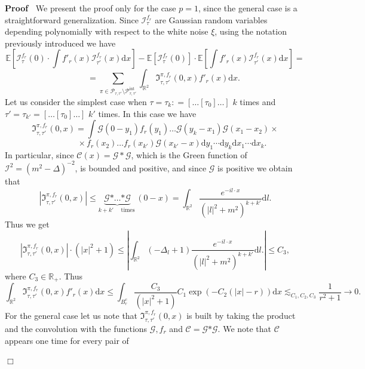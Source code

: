 \documentclass[a4paper,10pt]{article}
\newcommand{\asterisk}{\mathord{*}}
\newcommand{\mathd}{\mathrm{d}}
\newcommand{\tmop}[1]{\ensuremath{\operatorname{#1}}}
\newenvironment{proof}{\noindent\textbf{Proof\ }}{\hspace*{\fill}$\Box$\medskip}
\begin{document}
\begin{proof}
  We present the proof only for the case $p = 1$, since the general case is a
  straightforward generalization. Since $\mathcal{I}^{f_r}_{\tau}$ are
  Gaussian random variables depending polynomially with respect to the white
  noise $\xi$, using the notation previously introduced we have
  \[ \mathbb{E} \left[ \mathcal{I}^{f_r}_{\tau} (0) \cdot \int f'_r (x)
     \mathcal{I}^{f_r}_{\tau'} (x) \mathd x \right] -\mathbb{E}
     [\mathcal{I}^{f_r}_{\tau} (0)] \cdot \mathbb{E} \left[ \int f'_r (x)
     \mathcal{I}^{f_r}_{\tau'} (x) \mathd x \right] = \] \[ \qquad = \sum_{\pi \in
     \mathcal{\mathcal{} \mathcal{P}}_{\tau, \tau'} \setminus
     \mathcal{P}^{\tmop{int}}_{\tau, \tau'}} \int_{\mathbb{R}^2}
     \mathfrak{I}^{\pi, f_r}_{\tau, \tau'} (0, x) f'_r (x) \mathd x. \]
  Let us consider the simplest case when $\tau = \tau_k : = [\ldots [\tau_0]
  \ldots]$ $k$ times and $\tau' = \tau_{k'} = [\ldots [\tau_0] \ldots]$ $k'$
  times. In this case we have
  \[ \mathfrak{I}^{\pi, f_r}_{\tau, \tau'} (0, x) = \int \mathcal{G} (0 -
     y_1) f_r (y_1) \ldots \mathcal{G} (y_k - x_1) \mathcal{G} (x_1 - x_2)\times \]
     \[\qquad\qquad\times f_r
     (x_2) \ldots f_r (x_{k'}) \mathcal{G} (x_{k'} - x) \mathd y_1 \cdots
     \mathd y_k \mathd x_1 \cdots \mathd x_k . \]
  In particular, since $\mathcal{C} (x) = \mathcal{G} \ast \mathcal{G}$, which
  is the Green function of $\mathcal{I}^2 = (m^2 - \Delta)^{- 2}$, is bounded
  and positive, and since $\mathcal{G}$ is positive we obtain that
  \[ | \mathfrak{I}^{\pi, f_r}_{\tau, \tau'} (0, x) | \leqslant
     \underbrace{\mathcal{G} \asterisk \ldots \asterisk \mathcal{G}}_{k + k'
     \quad \tmop{times}} (0 - x) = \int_{\mathbb{R}^2} \frac{e^{- i l \cdot
     x}}{(| l |^2 + m^2)^{k + k'}} \mathd l. \]
  Thus we get
  \[ | \mathfrak{I}^{\pi, f_r}_{\tau, \tau'} (0, x) | \cdot (| x |^2 + 1)
     \leqslant \left| \int_{\mathbb{R}^2} (- \Delta_l + 1) \frac{e^{- i l
     \cdot x}}{(| l |^2 + m^2)^{k + k'}} \mathd l. \right| \leqslant C_3, \]
  where $C_3 \in \mathbb{R}_+$. Thus
  \[ \int_{\mathbb{R}^2} \mathfrak{I}^{\pi, f_r}_{\tau, \tau'} (0, x) f'_r
     (x) \mathd x \leqslant \int_{B_r^c} \frac{C_3}{(| x |^2 + 1)} C_1 \exp (-
     C_2 (| x | - r)) \mathd x \lesssim_{C_1, C_2, C_3} \frac{1}{r^2 + 1}
     \rightarrow 0. \]
  For the general case let us note that $\mathfrak{I}^{\pi, f_r}_{\tau, \tau'}
  (0, x)$ is built by taking the product and the convolution with the
  functions $\mathcal{G}, f_r$ and $\mathcal{C} = \mathcal{G} \asterisk
  \mathcal{G}$. We note that $\mathcal{C}$ appears one time for every pair of

\end{proof}
\end{document}
